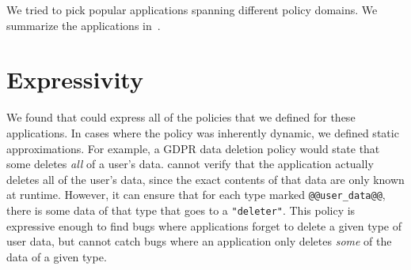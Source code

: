 We tried to pick popular applications spanning different policy domains.
%
We summarize the applications in~.

\section{Expressivity}
\label{sec:expressivity}
%
We found that \syslang{} could express all of the policies that we defined for these applications.
%
In cases where the policy was inherently dynamic, we defined static approximations.
%
For example, a GDPR data deletion policy would state that some \controller{} deletes \emph{all} of a user's data.
%
\sys{} cannot verify that the application actually deletes all of the user's data,
since the exact contents of that data are only known at runtime.
%
However, it can ensure that for each type marked \lstinline[language=CNL]|@@user_data@@|, 
there is some data of that type that goes to a \lstinline[language=CNL]|"deleter"|.
%
This policy is expressive enough to find bugs where applications forget to delete a given type of user data,
but cannot catch bugs where an application only deletes \emph{some} of the data of a given type.
%

